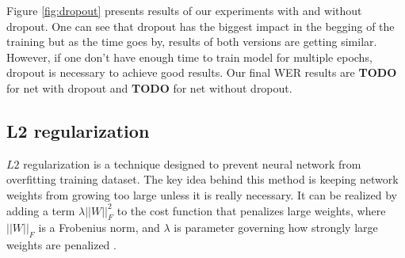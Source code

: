\documentclass[licencjacka,en]{pracamgr}
\begin{document}
\noindent%
\begin{minipage}{\linewidth}%
		\label{fig:dropout}		     
\end{minipage}

Figure \ref{fig:dropout} presents results of our experiments with and without dropout. One can see that dropout has the biggest impact in the begging of the training but as the time goes by, results of both versions are getting similar. However, if one don't have enough time to train model for multiple epochs, dropout is necessary to achieve good results. Our final WER results are \textbf{TODO} for net with dropout and \textbf{TODO} for net without dropout. 


\subsection{L2 regularization}
$L2$ regularization is a technique designed to prevent neural network from overfitting training dataset. The key idea behind this method is keeping network weights from growing too large unless it is really necessary. It can be realized by adding a term $\lambda ||W||^2_F $ to the cost function that penalizes large weights, where $||W||_F $ is
a Frobenius norm, and $\lambda$ is parameter governing how strongly large weights are penalized \cite{L2}.
\end{document}
